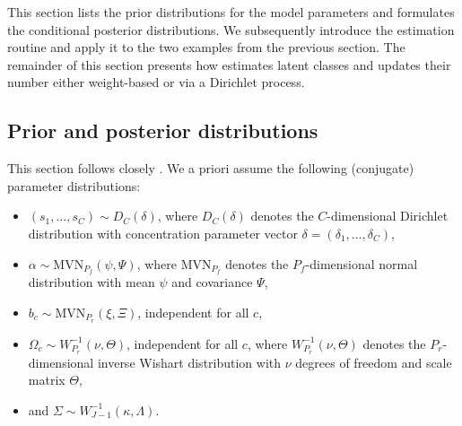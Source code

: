 \documentclass[article]{jss}
\newcommand{\fct}[1]{\code{#1()}}
\begin{document}
This section lists the prior distributions for the model parameters and formulates the conditional posterior distributions. We subsequently introduce the estimation routine \fct{fit\_model} and apply it to the two examples from the previous section. The remainder of this section presents how  estimates latent classes and updates their number either weight-based or via a Dirichlet process.

\subsection{Prior and posterior distributions} \label{subsec:prior_and_posterior}

This section follows closely \cite{Oelschlaeger:2020}. We a priori assume the following (conjugate) parameter distributions:
\begin{itemize}
  \item $(s_1,\dots,s_C)\sim D_C(\delta)$, where $D_C(\delta)$ denotes the $C$-dimensional Dirichlet distribution with concentration parameter vector $\delta = (\delta_1,\dots,\delta_C)$,
  \item $\alpha\sim \text{MVN}_{P_f}(\psi,\Psi)$, where $\text{MVN}_{P_f}$ denotes the $P_f$-dimensional normal distribution with mean $\psi$ and covariance $\Psi$,
  \item $b_c \sim \text{MVN}_{P_r}(\xi,\Xi)$, independent for all $c$,
  \item $\Omega_c \sim W^{-1}_{P_r}(\nu,\Theta)$, independent for all $c$, where $W^{-1}_{P_r}(\nu,\Theta)$ denotes the $P_r$-dimensional inverse Wishart distribution with $\nu$ degrees of freedom and scale matrix $\Theta$,
  \item and $\Sigma \sim W^{-1}_{J-1}(\kappa,\Lambda)$.
\end{itemize}
\end{document}
